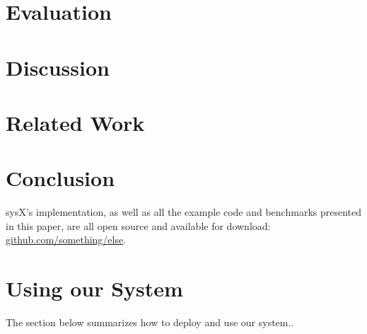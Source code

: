 \documentclass[sigplan, review, screen, 10pt]{acmart}
\begin{document}
\section{Evaluation}
\label{eval}

\section{Discussion}
\label{discussion}

\section{Related Work}
\label{related}

\section{Conclusion}
\label{conclusion}

sysX's implementation, as well as all the example code and benchmarks presented in this paper, are all open source and available for download:
\href{https://github.com/something/else}{github.com/something/else}.
\begin{acks}
\end{acks}

{\small

}

\appendix

\section{Using our System}
\label{using-apx}

The section below summarizes how to deploy and use our system..
\end{document}
